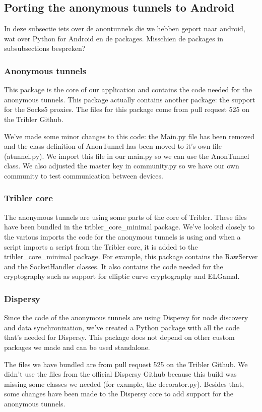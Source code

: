 \documentclass{article}
\begin{document}
\subsection{Porting the anonymous tunnels to Android}
In deze subsectie iets over de anontunnels die we hebben geport naar android, wat over Python for Android en de packages. Misschien de packages in subsubsections bespreken?

\subsubsection{Anonymous tunnels}
This package is the core of our application and contains the code needed for the anonymous tunnels. This package actually contains another package: the support for the Socks5 proxies. The files for this package come from pull request 525 on the Tribler Github.

We've made some minor changes to this code: the Main.py file has been removed and the class definition of AnonTunnel has been moved to it’s own file (atunnel.py). We import this file in our main.py so we can use the AnonTunnel class. We also adjusted the master key in community.py so we have our own community to test communication between devices.

\subsubsection{Tribler core}
The anonymous tunnels are using some parts of the core of Tribler. These files have been bundled in the tribler\_core\_minimal package. We’ve looked closely to the various imports the code for the anonymous tunnels is using and when a script imports a script from the Tribler core, it is added to the tribler\_core\_minimal package. For example, this package contains the RawServer and the SocketHandler classes. It also contains the code needed for the cryptography such as support for elliptic curve cryptography and ELGamal.

\subsubsection{Dispersy}
Since the code of the anonymous tunnels are using Dispersy for node discovery and data synchronization, we’ve created a Python package with all the code that’s needed for Dispersy. This package does not depend on other custom packages we made and can be used standalone.

The files we have bundled are from pull request 525 on the Tribler Github. We didn’t use the files from the official Dispersy Github because this build was missing some classes we needed (for example, the decorator.py). Besides that, some changes have been made to the Dispersy core to add support for the anonymous tunnels.
\end{document}
